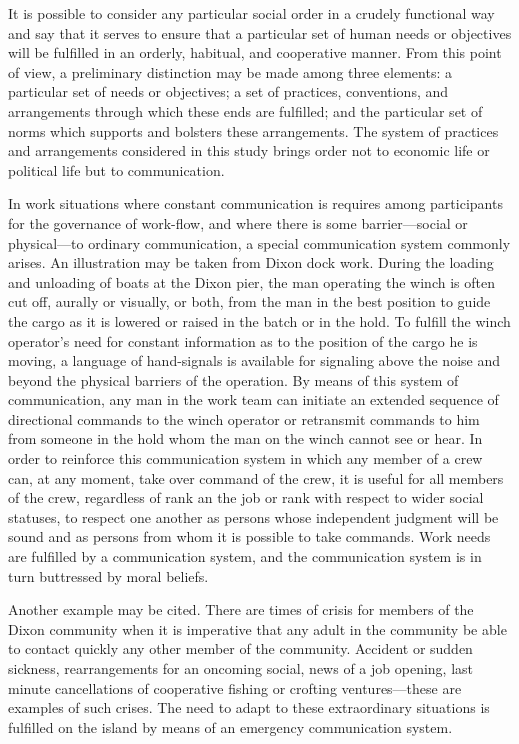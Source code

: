 \documentclass[openany,nobib]{tufte-book}
\begin{document}
It is possible to consider any particular social order in a crudely
functional way and say that it serves to ensure that a particular set of
human needs or objectives will be fulfilled in an orderly, habitual, and
cooperative manner. From this point of view, a preliminary distinction
may be made among three elements: a particular set of needs or
objectives; a set of practices, conventions, and arrangements through
which these ends are fulfilled; and the particular set of norms which
supports and bolsters these arrangements. The system of practices and
arrangements considered in this study brings order not to economic life
or political life but to communication.

In work situations where constant communication is requires among
participants for the governance of work-flow, and where there is some
barrier---social or physical---to ordinary communication, a special
communication system commonly arises. An illustration may be taken from
Dixon dock work. During the loading and unloading of boats at the Dixon
pier, the man operating the winch is often cut off, aurally or visually,
or both, from the man in the best position to guide the cargo as it is
lowered or raised in the batch or in the hold. To fulfill the winch
operator's need for constant information as to the position of the cargo
he is moving, a language of hand-signals is available for signaling
above the noise and beyond the physical barriers of the operation. By
means of this system of communication, any man in the work team can
initiate an extended sequence of directional commands to the winch
operator or retransmit commands to him from someone in the hold whom the
man on the winch cannot see or hear. In order to reinforce this
communication system in which any member of a crew can, at any moment,
take over command of the crew, it is useful for all members of the crew,
regardless of rank an the job or rank with respect to wider social
statuses, to respect one another as persons whose independent judgment
will be sound and as persons from whom it is possible to take commands.
Work needs are fulfilled by a communication system, and the
communication system is in turn buttressed by moral beliefs.

Another example may be cited. There are times of crisis for members of
the Dixon community when it is imperative that any adult in the
community be able to contact quickly any other member of the community.
Accident or sudden sickness, rearrangements for an oncoming social, news
of a job opening, last minute cancellations of cooperative fishing or
crofting ventures---these are examples of such crises. The need to adapt
to these extraordinary situations is fulfilled on the island by means of
an emergency communication system.
\end{document}
